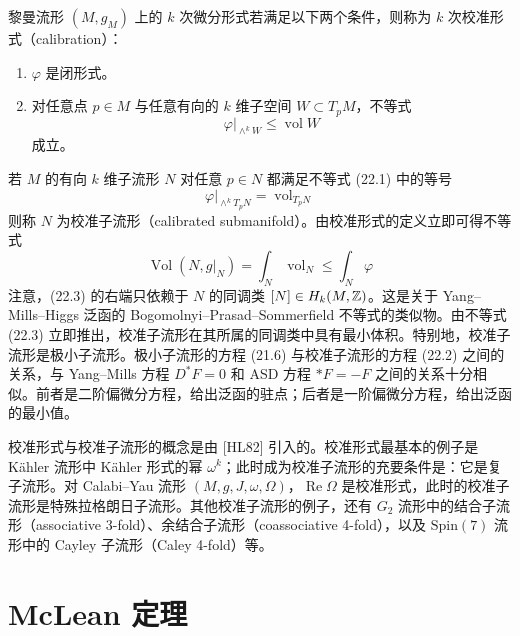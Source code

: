 黎曼流形 $(M, g_M)$ 上的 $k$ 次微分形式若满足以下两个条件，则称为 $k$ 次校准形式（calibration）：
\begin{enumerate}[label=\arabic*.]
\item $\varphi$ 是闭形式。
\item 对任意点 $p \in M$ 与任意有向的 $k$ 维子空间 $W \subset T_pM$，不等式
\begin{equation}
\varphi\big|_{\wedge^{k}W} \le \operatorname{vol}W \tag{22.1}
\end{equation}
成立。
\end{enumerate}
若 $M$ 的有向 $k$ 维子流形 $N$ 对任意 $p \in N$ 都满足不等式 (22.1) 中的等号
\begin{equation}
\varphi\big|_{\wedge^{k}T_pN} = \operatorname{vol}_{T_pN} \tag{22.2}
\end{equation}
则称 $N$ 为校准子流形（calibrated submanifold）。由校准形式的定义立即可得不等式
\begin{equation}
\operatorname{Vol}(N, g|_{N}) = \int_{N}\operatorname{vol}_{N} \le \int_{N}\varphi \tag{22.3}
\end{equation}
注意，(22.3) 的右端只依赖于 $N$ 的同调类 $[N] \in H_k(M, \mathbb{Z})$。这是关于 Yang--Mills--Higgs 泛函的 Bogomolnyi--Prasad--Sommerfield 不等式的类似物。由不等式 (22.3) 立即推出，校准子流形在其所属的同调类中具有最小体积。特别地，校准子流形是极小子流形。极小子流形的方程 (21.6) 与校准子流形的方程 (22.2) 之间的关系，与 Yang--Mills 方程 $D^{*}F = 0$ 和 ASD 方程 $*F = -F$ 之间的关系十分相似。前者是二阶偏微分方程，给出泛函的驻点；后者是一阶偏微分方程，给出泛函的最小值。

校准形式与校准子流形的概念是由 [HL82] 引入的。校准形式最基本的例子是 Kähler 流形中 Kähler 形式的幂 $\omega^{k}$；此时成为校准子流形的充要条件是：它是复子流形。对 Calabi--Yau 流形 $(M, g, J, \omega, \Omega)$，$\operatorname{Re}\Omega$ 是校准形式，此时的校准子流形是特殊拉格朗日子流形。其他校准子流形的例子，还有 $G_2$ 流形中的结合子流形（associative 3-fold）、余结合子流形（coassociative 4-fold），以及 $\mathrm{Spin}(7)$ 流形中的 Cayley 子流形（Caley 4-fold）等。


\section{McLean 定理}


